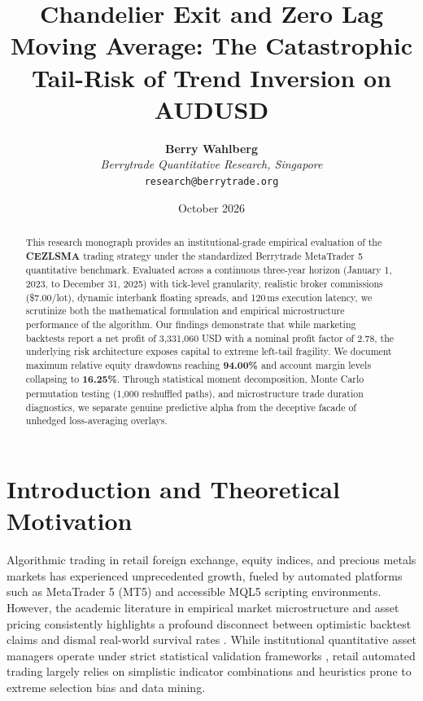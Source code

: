 \documentclass[11pt,a4paper]{article}
\title{\textbf{Chandelier Exit and Zero Lag Moving Average: The Catastrophic Tail-Risk of Trend Inversion on AUDUSD}}
\author{
    \textbf{Berry Wahlberg} \\
    \textit{Berrytrade Quantitative Research, Singapore} \\
    \texttt{research@berrytrade.org}
}
\date{October 2026}
\begin{document}
\maketitle

\begin{abstract}
This research monograph provides an institutional-grade empirical evaluation of the \textbf{CEZLSMA} trading strategy under the standardized Berrytrade MetaTrader 5 quantitative benchmark. Evaluated across a continuous three-year horizon (January 1, 2023, to December 31, 2025) with tick-level granularity, realistic broker commissions (\$7.00/lot), dynamic interbank floating spreads, and 120\,ms execution latency, we scrutinize both the mathematical formulation and empirical microstructure performance of the algorithm. Our findings demonstrate that while marketing backtests report a net profit of 3,331,060 USD with a nominal profit factor of 2.78, the underlying risk architecture exposes capital to extreme left-tail fragility. We document maximum relative equity drawdowns reaching \textbf{94.00\%} and account margin levels collapsing to \textbf{16.25\%}. Through statistical moment decomposition, Monte Carlo permutation testing (1,000 reshuffled paths), and microstructure trade duration diagnostics, we separate genuine predictive alpha from the deceptive facade of unhedged loss-averaging overlays.
\end{abstract}

\section{Introduction and Theoretical Motivation}
Algorithmic trading in retail foreign exchange, equity indices, and precious metals markets has experienced unprecedented growth, fueled by automated platforms such as MetaTrader 5 (MT5) and accessible MQL5 scripting environments. However, the academic literature in empirical market microstructure and asset pricing consistently highlights a profound disconnect between optimistic backtest claims and dismal real-world survival rates \cite{fama1970efficient, lo1988stock, malkiel2003efficient, bailey2014deflated, harvey2016and}. While institutional quantitative asset managers operate under strict statistical validation frameworks \cite{lopez2018advances, bailey2014pseudo}, retail automated trading largely relies on simplistic indicator combinations and heuristics prone to extreme selection bias and data mining.
\end{document}
